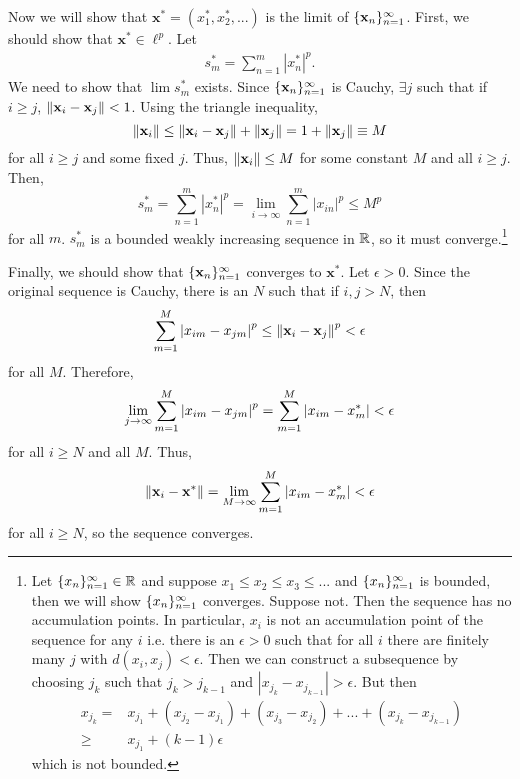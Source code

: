 \begin{example}
  Now we will show that $\mathbf{x}^\ast = (x_{1}^\ast, x_{2}^\ast,
  ... )$ is the limit of $\{{\mathbf{x}}_n \}_{n=1}^\infty$.  First, we should show
  that $\mathbf{x}^\ast \in \ell^p$. Let 
  \begin{align*}
    s_m^\ast = \sum_{n=1}^m |x^\ast_n|^p.
  \end{align*}
  We need to show that $\lim s_m^\ast $ exists.  Since
  $\{{\mathbf{x}}_n \}_{n=1}^\infty$ is Cauchy, $\exists j$ such that if $i \geq j$,
  $\left\Vert {\mathbf{x}_i - \mathbf{x}_j} \right\Vert < 1$. Using the triangle
  inequality, 
  \[ \left\Vert {\mathbf{x}_i} \right\Vert \leq \left\Vert {\mathbf{x}_i - \mathbf{x}_j} \right\Vert +
  \left\Vert {\mathbf{x}_j} \right\Vert = 1 + \left\Vert {\mathbf{x}_j} \right\Vert \equiv M \]
  for all $i \geq j$ and some fixed $j$. Thus, $\left\Vert {\mathbf{x}_i} \right\Vert
  \leq M$ for some constant $M$ and all $i \geq j$. Then, 
  \[
  s_m^\ast = \sum_{n=1}^m |x_{n}^\ast|^p = \lim_{i \to \infty} \sum_{n=1}^m |x_{in}|^p \leq
  M^{p} \]
  for all $m$. $s_m^\ast$ is a bounded weakly increasing sequence in
  $\mathbb{R}$, so it must converge.\footnote{Let $\{{x}_n \}_{n=1}^\infty \in \mathbb{R}$ and suppose $x_1
    \leq x_2 \leq x_3 \leq ...$ and $\{{x}_n \}_{n=1}^\infty$ is bounded, then we will
    show $\{{x}_n \}_{n=1}^\infty$ converges. Suppose not. Then the sequence has no
    accumulation points. In particular, $x_i$ is not an accumulation
    point of the sequence for any $i$ i.e. there is an $\epsilon>0$
    such that for all $i$ there are finitely many $j$ with $d(x_i,
    x_j) < \epsilon$. Then we can construct a subsequence
    by choosing $j_k$ such that $j_k> j_{k-1}$ and $|x_{j_k} -
    x_{j_{k-1}} | > \epsilon$. But then 
    \begin{align*}
      x_{j_k} = & x_{j_1} + (x_{j_2} - x_{j_1}) + (x_{j_3} - x_{j_2}) +
      ... + (x_{j_k} - x_{j_{k-1}} ) \\
      \geq & x_{j_1} + (k-1) \epsilon 
    \end{align*}
    which is not bounded.}
  
  Finally, we should show that $\{{\mathbf{x}}_n \}_{n=1}^\infty$ converges to
  $\mathbf{x}^\ast$. Let $\epsilon>0$. 
  Since the original sequence is Cauchy, there is an $N$ such that if
  $i,j > N$, then
  \begin{align*}
    \sum_{m=1}^M \left\vert {x_{im} - x_{jm}} \right\vert^p \leq \left\Vert {\mathbf{x}_i -
      \mathbf{x}_j} \right\Vert^p < \epsilon
  \end{align*}
  for all $M$. Therefore, 
  \begin{align*}
    \lim_{j {\rightarrow} \infty} \sum_{m=1}^M \left\vert {x_{im} - x_{jm}} \right\vert^p =
    \sum_{m=1}^M\left\vert {x_{im} - x_m^\ast} \right\vert < \epsilon 
  \end{align*}
  for all $i \geq N$ and all $M$. Thus, 
  \[
  \left\Vert {\mathbf{x}_i - \mathbf{x}^\ast} \right\Vert = \lim_{M {\rightarrow} \infty}
  \sum_{m=1}^M\left\vert {x_{im} - x_m^\ast} \right\vert < \epsilon 
  \]
  for all $i \geq N$, so the sequence converges.
 \end{example}

